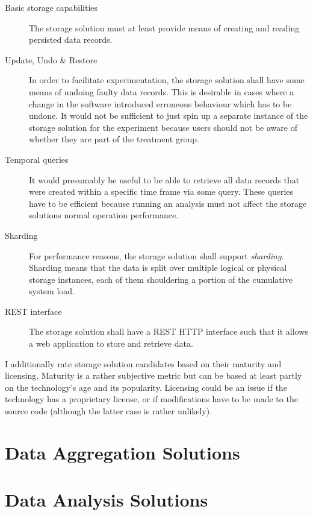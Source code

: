 \begin{description}
\item [Basic storage capabilities]
The storage solution must at least provide means of creating and reading persisted data records.
\item [Update, Undo \& Restore]
In order to facilitate experimentation, the storage solution shall have some means of undoing faulty data records.
This is desirable in cases where a change in the software introduced erroneous behaviour which has to be undone.
It would not be sufficient to just spin up a separate instance of the storage solution for the experiment because users should not be aware of whether they are part of the treatment group.
\item [Temporal queries]
It would presumably be useful to be able to retrieve all data records that were created within a specific time frame via some query.
These queries have to be efficient because running an analysis must not affect the storage solutions normal operation performance.
\item [Sharding]
For performance reasons, the storage solution shall support \emph{sharding}.
Sharding means that the data is split over multiple logical or physical storage instances, each of them shouldering a portion of the cumulative system load.
\item [REST interface]
The storage solution shall have a \ac{REST} HTTP interface such that it allows a web application to store and retrieve data.
\end{description}

I additionally rate storage solution candidates based on their maturity and licensing.
Maturity is a rather subjective metric but can be based at least partly on the technology's age and its popularity.
Licensing could be an issue if the technology has a proprietary license, or if modifications have to be made to the source code (although the latter case is rather unlikely).

\section{Data Aggregation Solutions}
\label{sec:system:aggregation}

\section{Data Analysis Solutions}
\label{sec:system:analysis}
